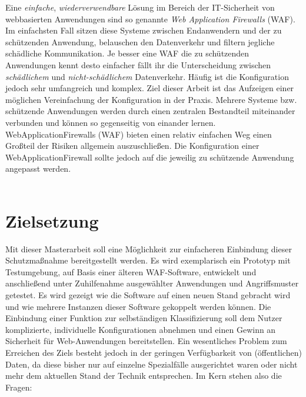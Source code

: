 Eine \emph{einfache}, \emph{wiederverwendbare} Lösung im Bereich der IT-Sicherheit von webbasierten Anwendungen sind so genannte \emph{Web Application Firewalls} (WAF). Im einfachsten Fall sitzen diese Systeme zwischen Endanwendern und der zu schützenden Anwendung, belauschen den Datenverkehr und filtern jegliche schädliche Kommunikation. Je besser eine WAF die zu schützenden Anwendungen kennt desto einfacher fällt ihr die Unterscheidung zwischen \emph{schädlichem} und \emph{nicht-schädlichem} Datenverkehr. Häufig ist die Konfiguration jedoch sehr umfangreich und komplex. Ziel dieser Arbeit ist das Aufzeigen einer möglichen Vereinfachung der Konfiguration in der Praxis. Mehrere Systeme bzw. schützende Anwendungen werden durch einen zentralen Bestandteil miteinander verbunden und können so gegenseitig von einander lernen. WebApplicationFirewalls (WAF) bieten einen relativ einfachen Weg einen Großteil der Risiken allgemein auszuschließen. Die Konfiguration einer WebApplicationFirewall sollte jedoch auf die jeweilig zu schützende Anwendung angepasst werden. \\\\



\section{Zielsetzung}

Mit dieser Masterarbeit soll eine Möglichkeit zur einfacheren Einbindung dieser Schutzmaßnahme bereitgestellt werden. Es wird exemplarisch ein Prototyp mit Testumgebung, auf Basis einer älteren WAF-Software, entwickelt und anschließend unter Zuhilfenahme ausgewählter  Anwendungen und Angriffsmuster getestet.  Es wird gezeigt wie die Software auf einen neuen Stand gebracht wird und wie mehrere Instanzen dieser Software gekoppelt werden können. Die Einbindung einer Funktion zur selbständigen Klassifizierung soll dem Nutzer komplizierte, individuelle Konfigurationen abnehmen und einen Gewinn an Sicherheit für Web-Anwendungen bereitstellen. Ein wesentliches Problem zum Erreichen des Ziels besteht jedoch in der geringen Verfügbarkeit von (öffentlichen) Daten, da diese bisher nur auf einzelne Spezialfälle ausgerichtet waren oder nicht mehr dem aktuellen Stand der Technik entsprechen. Im Kern stehen also die Fragen:

